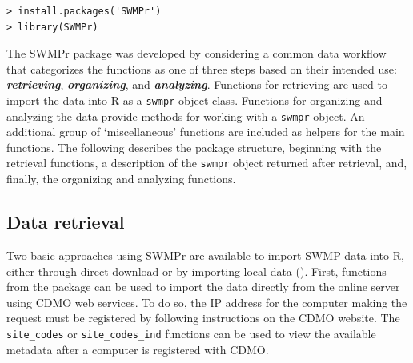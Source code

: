 \documentclass[10pt,letterpaper]{article}\usepackage[]{graphicx}\usepackage[]{color}
\makeatletter
\newenvironment{kframe}{%
 \def\at@end@of@kframe{}%
 \ifinner\ifhmode%
  \def\at@end@of@kframe{\end{minipage}}%
  \begin{minipage}{\columnwidth}%
 \fi\fi%
 \def\FrameCommand##1{\hskip\@totalleftmargin \hskip-\fboxsep
 \colorbox{shadecolor}{##1}\hskip-\fboxsep
     \hskip-\linewidth \hskip-\@totalleftmargin \hskip\columnwidth}%
 \MakeFramed {\advance\hsize-\width
   \@totalleftmargin\z@ \linewidth\hsize
   \@setminipage}}%
 {\par\unskip\endMakeFramed%
 \at@end@of@kframe}
\newenvironment{knitrout}{}{} %
\newcommand{\Bigtxt}[1]{\textbf{\textit{#1}}}
\makeatother
\begin{document}
\begin{knitrout}\small
{}\color{fgcolor}\begin{kframe}
\begin{verbatim}
> install.packages('SWMPr')
> library(SWMPr)
\end{verbatim}
\end{kframe}
\end{knitrout}


The SWMPr package was developed by considering a common data workflow that categorizes the functions as one of three steps based on their intended use: \Bigtxt{retrieving}, \Bigtxt{organizing}, and \Bigtxt{analyzing}.  Functions for retrieving are used to import the data into R as a \texttt{swmpr} object class.  Functions for organizing and analyzing the data provide methods for working with a \texttt{swmpr} object.  An additional group of `miscellaneous' functions are included as helpers for the main functions.  The following describes the package structure, beginning with the retrieval functions, a description of the \texttt{swmpr} object returned after retrieval, and, finally, the organizing and analyzing functions.

\subsection*{Data retrieval}

Two basic approaches using SWMPr are available to import \gls{SWMP} data into R, either through direct download or by importing local data (). First, functions from the package can be used to import the data directly from the online server using \gls{CDMO} web services. To do so, the IP address for the computer making the request must be registered by following instructions on the \gls{CDMO} website.  The \texttt{site\_codes} or \texttt{site\_codes\_ind} functions can be used to view the available metadata after a computer is registered with \gls{CDMO}. 
\end{document}
